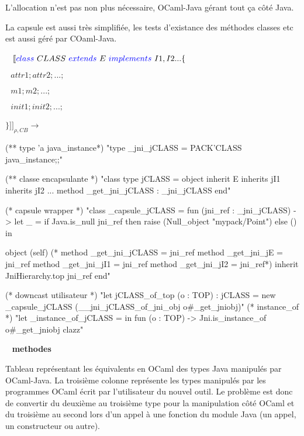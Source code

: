 \documentclass[a4paper, 11pt, notitlepage]{article}
\begin{document}
L'allocation n'est pas non plus nécessaire, OCaml-Java gérant tout ça côté Java. 

La capsule est aussi très simplifiée, les tests d'existance des méthodes classes etc est aussi géré par COaml-Java.

\ 
\newline
\noindent
$[\![ {\color{blue}class}\ CLASS\ 
 {\color{blue}extends}\  E \ 
 {\color{blue}implements}\  I1,I2... \{$

 $ \ \ \ attr1; attr2; ...;$

  $\ \ \ m1; m2; ...;$

  $\ \ \ init1; init2; ...;$

 $\} ]\!]_{\rho,CB}\longrightarrow$
\ 
\newline

\begin{OCaml}

(** type 'a java_instance*)
"type _jni_jCLASS = PACK'CLASS java_instance;;"

(** classe encapsulante *)
"class type jCLASS =
   object inherit E
   inherits jI1
   inherits jI2 ...
   method _get_jni_jCLASS : _jni_jCLASS
   end"

(* capsule wrapper *)
"class _capsule_jCLASS = 
  fun (jni_ref : _jni_jCLASS) ->
     let _ =
        if Java.is_null jni_ref
        then raise (Null_object "mypack/Point")
        else ()
     in

    object (self)
     (* method _get_jni_jCLASS = jni_ref
      method _get_jni_jE = jni_ref
      method _get_jni_jI1 = jni_ref
      method _get_jni_jI2 = jni_ref*)
      inherit JniHierarchy.top jni_ref
    end"

(* downcast utilisateur *)
"let jCLASS_of_top (o : TOP) : jCLASS =
    new _capsule_jCLASS (__jni_jCLASS_of_jni_obj o#_get_jniobj)"
(* instance_of *)
"let _instance_of_jCLASS =
    in fun (o : TOP) -> Jni.is_instance_of o#_get_jniobj clazz"


\end{OCaml}
\ 
\newline
\noindent
\textbf{ methodes } 



Tableau représentant les équivalents en OCaml des types Java manipulés
par OCaml-Java.
La troisième colonne représente les types manipulés par les programmes
OCaml écrit par l'utilisateur du nouvel outil.
Le problème est donc de convertir du deuxième au troisième type pour la manipulation côté OCaml et du troisième au second lors d'un appel à une fonction du module Java (un appel, un constructeur ou autre).
\end{document}
